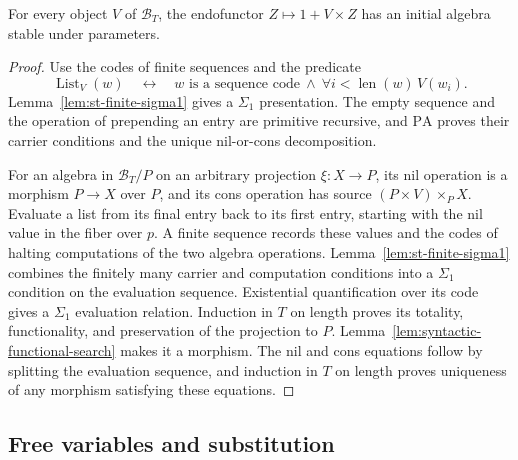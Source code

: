\begin{proposition}
\label{prop:st-list-initiality}
For every object $V$ of $\mathcal B_T$, the endofunctor
$Z\mapsto1+V\times Z$ has an initial algebra stable under
parameters.
\end{proposition}
\begin{proof}
Use the codes of finite sequences and the predicate
\[
 \operatorname{List}_V(w)\quad\longleftrightarrow\quad
 w\text{ is a sequence code}\ \land\
       \forall i<\operatorname{len}(w)\,V(w_i).
\]
Lemma~\ref{lem:st-finite-sigma1} gives a $\Sigma_1$ presentation.
The empty sequence and the operation of prepending an entry are
primitive recursive, and $\mathrm{PA}$ proves their carrier
conditions and the unique nil-or-cons decomposition.

For an algebra in $\mathcal B_T/P$ on an arbitrary projection
$\xi:X\to P$, its nil operation is a morphism $P\to X$ over
$P$, and its cons operation has source
$(P\times V)\times_P X$. Evaluate a list from its final entry
back to its first entry, starting with the nil value in the fiber
over $p$. A finite sequence records these values and the
codes of halting computations of the two algebra operations. Lemma~\ref{lem:st-finite-sigma1} combines the finitely many carrier and
computation conditions into a $\Sigma_1$ condition on the evaluation sequence.
Existential quantification over its code gives a $\Sigma_1$ evaluation
relation. Induction in $T$ on length proves
its totality, functionality, and preservation of the projection to
$P$. Lemma~\ref{lem:syntactic-functional-search} makes it a morphism.
The nil and cons equations follow by splitting the evaluation sequence,
and induction in $T$ on length proves uniqueness of any morphism
satisfying these equations.
\end{proof}

\subsection{Free variables and substitution}
\label{sec:st-substitution-realization}

